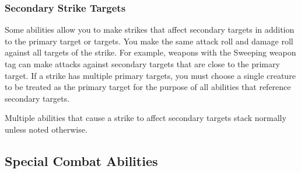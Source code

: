         \subsubsection{Secondary Strike Targets}\label{Secondary Strike Targets}
            Some abilities allow you to make strikes that affect secondary targets in addition to the primary target or targets.
            You make the same attack roll and damage roll against all targets of the strike.
            For example, weapons with the Sweeping weapon tag can make attacks against secondary targets that are close to the primary target.
            If a strike has multiple primary targets, you must choose a single creature to be treated as the primary target for the purpose of all abilities that reference secondary targets.

            Multiple abilities that cause a strike to affect secondary targets stack normally unless noted otherwise.

    \subsection{Special Combat Abilities}\label{Special Combat Abilities}


